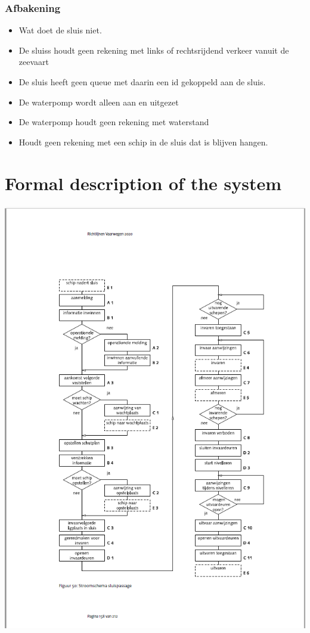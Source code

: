 \subsection{Afbakening}
\begin{itemize}
	\item Wat doet de sluis niet.
	\item De sluiss houdt geen rekening met links of rechtsrijdend verkeer vanuit de zeevaart
	\item De sluis heeft geen queue met daarin een id gekoppeld aan de sluis.
	\item De waterpomp wordt alleen aan en uitgezet
	\item De waterpomp houdt geen rekening met waterstand
	\item Houdt geen rekening met een schip in de sluis dat is blijven hangen.
	
\end{itemize}

\chapter{Formal description of the system}

\includegraphics[scale=0.65]{sluispassage.png}

